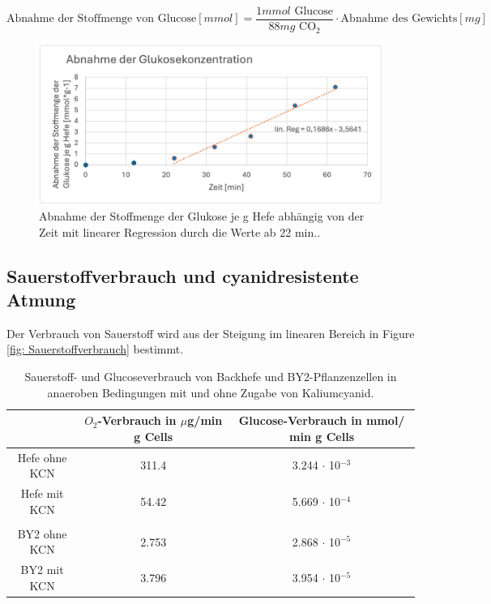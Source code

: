 \documentclass[10pt,a4paper]{article}
\begin{document}
	\begin{equation}\label{eq:anareobeglucoseverbrauch}
		\text{Abnahme der Stoffmenge von Glucose} [mmol]= \frac{1 mmol   \text{ Glucose}}{88mg  \text{ CO}_2} \cdot \text{Abnahme des Gewichts}[mg]
	\end{equation}
	
	\begin{figure}[H]
		\centering
		\includegraphics[scale=1]{anaerobe_GluConc.png}
		\caption{Abnahme der Stoffmenge der Glukose je g Hefe abhängig von der Zeit mit linearer Regression durch die Werte ab 22 min..}
		\label{fig:wurzel ohne P}
	\end{figure}
	
	\subsection{Sauerstoffverbrauch und cyanidresistente Atmung}
	Der Verbrauch von Sauerstoff wird aus der Steigung im linearen Bereich in Figure \ref{fig: Sauerstoffverbrauch} bestimmt. 
		\begin{table}[H]
		\centering
		\caption{Sauerstoff- und Glucoseverbrauch von Backhefe und BY2-Pflanzenzellen in anaeroben Bedingungen mit und ohne Zugabe von Kaliumcyanid.}
		\label{tab:O2verbrauch und CN}
		\begin{tabular}{ccc}
			\toprule
			& $O_2$-Verbrauch in $\mu$g/min g Cells& Glucose-Verbrauch in mmol/ min g Cells\\
			\midrule
			Hefe ohne KCN & 311.4 & 3.244 $\cdot$ 10$^{-3}$\\
			Hefe mit KCN & 54.42& 5.669 $\cdot$ 10$^{-4}$\\
			& & \\
			BY2 ohne KCN & 2.753 & 2.868 $\cdot$ 10$^{-5}$\\
			BY2 mit KCN & 3.796& 3.954 $\cdot$ 10$^{-5}$\\
			\bottomrule
		\end{tabular}
	\end{table}	
	
\end{document}
